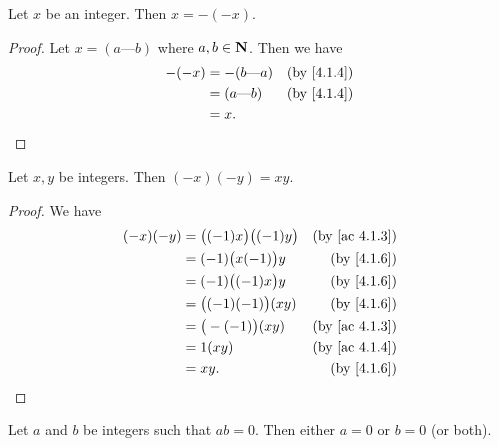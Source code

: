 \begin{additional corollary}\label{ac 4.1.4}
Let \(x\) be an integer.
Then \(x = -(-x)\).
\end{additional corollary}

\begin{proof}
  Let \(x = (a \text{---} b)\) where \(a, b \in \mathbf{N}\).
  Then we have
  \begin{align*}
    -(-x) & = -(b \text{---} a) & \text{(by \cref{4.1.4})} \\
          & = (a \text{---} b)  & \text{(by \cref{4.1.4})} \\
          & = x.
  \end{align*}
\end{proof}

\begin{additional corollary}\label{ac 4.1.5}
Let \(x, y\) be integers.
Then \((-x)(-y) = xy\).
\end{additional corollary}

\begin{proof}
  We have
  \begin{align*}
    (-x)(-y) & = \big((-1)x\big) \big((-1)y\big) & \text{(by \cref{ac 4.1.3})} \\
             & = (-1)\big(x(-1)\big)y            & \text{(by \cref{4.1.6})}    \\
             & = (-1)\big((-1)x\big)y            & \text{(by \cref{4.1.6})}    \\
             & = \big((-1)(-1)\big)(xy)          & \text{(by \cref{4.1.6})}    \\
             & = \big(-(-1)\big)(xy)             & \text{(by \cref{ac 4.1.3})} \\
             & = 1(xy)                           & \text{(by \cref{ac 4.1.4})} \\
             & = xy.                             & \text{(by \cref{4.1.6})}
  \end{align*}
\end{proof}

\begin{proposition}\label{4.1.8}
  Let \(a\) and \(b\) be integers such that \(ab = 0\).
  Then either \(a = 0\) or \(b = 0\) (or both).
\end{proposition}

